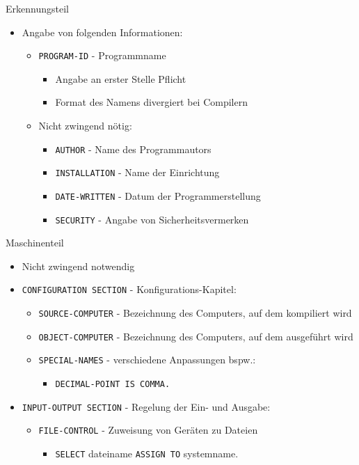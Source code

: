 \begin{slide}{Erkennungsteil}
	\begin{itemize}
		\item{Angabe von folgenden Informationen:
			\begin{itemize}
				\item{\texttt{PROGRAM-ID} - Programmname
					\begin{itemize}
						\item{Angabe an erster Stelle Pflicht}
						\item{Format des Namens divergiert bei Compilern}
					\end{itemize}				
				}
				\item{Nicht zwingend nötig:
				\begin{itemize}
					\item{\texttt{AUTHOR} - Name des Programmautors}
					\item{\texttt{INSTALLATION} - Name der Einrichtung}
					\item{\texttt{DATE-WRITTEN} - Datum der Programmerstellung}
					\item{\texttt{SECURITY} - Angabe von Sicherheitsvermerken}
				\end{itemize}
				}
			\end{itemize}		
		}
	\end{itemize}
\end{slide}

\begin{slide}{Maschinenteil}
	\begin{itemize}
		\item{Nicht zwingend notwendig}
		\item{\texttt{CONFIGURATION SECTION} - Konfigurations-Kapitel:
			\begin{itemize}
				\item{\texttt{SOURCE-COMPUTER} - Bezeichnung des Computers, auf dem kompiliert wird}
				\item{\texttt{OBJECT-COMPUTER} - Bezeichnung des Computers, auf dem ausgeführt wird}
				\item{\texttt{SPECIAL-NAMES} - verschiedene Anpassungen bspw.:
					\begin{itemize}
						\item{\texttt{DECIMAL-POINT IS COMMA.}}
					\end{itemize}				
				}
			\end{itemize}		
		}
		\item{\texttt{INPUT-OUTPUT SECTION} - Regelung der Ein- und Ausgabe:
			\begin{itemize}
				\item{\texttt{FILE-CONTROL} - Zuweisung von Geräten zu Dateien
					\begin{itemize}
						\item{\texttt{SELECT} dateiname \texttt{ASSIGN TO} systemname.}
					\end{itemize}				
				}
			\end{itemize}		
		}
	\end{itemize}
\end{slide}

